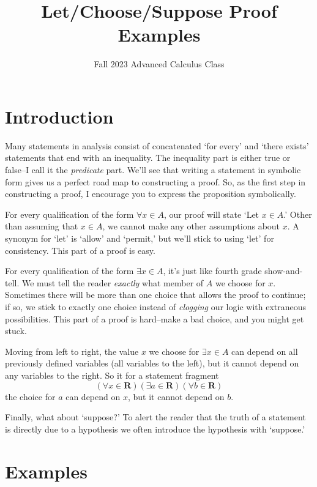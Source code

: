 \documentclass[12pt,fleqn,answers]{exam}
\title{Let/Choose/Suppose Proof Examples}
\author{Fall 2023 Advanced Calculus Class}
\newcommand{\reals}{\mathbf{R}}
\begin{document}
\maketitle

\section{Introduction}
Many statements in analysis consist of concatenated `for every' and `there exists' 
statements that end with an inequality. The inequality part is either true or 
false--I call it the \emph{predicate} part. We'll see that writing a statement in 
symbolic form gives us a perfect road map to constructing a proof. So, as the 
first step in constructing a proof, I encourage you to express the proposition 
symbolically.

For every qualification of the form $\forall x \in A$, our proof will state 
`Let $x \in A$.' Other than assuming that $x \in A$, we cannot make any other 
assumptions about $x$. A synonym for `let' is `allow' and `permit,'  but we'll 
stick to using `let' for consistency.  This part of a proof is easy.

For every qualification of the form $\exists x \in A$, it's just like fourth 
grade show-and-tell. We must tell the reader \emph{exactly} what member of $A$ 
we choose for $x$.  Sometimes there will be more than one choice that allows 
the proof to continue; if so, we stick to exactly one choice instead of 
\emph{clogging} our logic with extraneous possibilities.  This part of
a proof is hard--make a bad choice, and you might get stuck. 

Moving from left to right, the value $x$ we choose for  $\exists x \in A$ can 
depend on all previously defined variables (all variables to the left), but 
it cannot depend on any variables to the right. So it for a  statement fragment
\begin{equation*}
    \left(\forall x \in \reals \right) \left(\exists a \in \reals\right) \left(\forall b \in \reals\right) 
\end{equation*}
the choice for $a$ can depend on $x$, but it cannot depend on $b$.

Finally, what about `suppose?' To alert the reader that 
the truth of a statement is directly due to a hypothesis we often
introduce the hypothesis with `suppose.'

\section{Examples}
\end{document}
